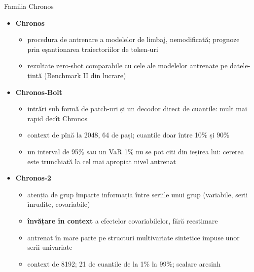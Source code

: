 \begin{frame}{Familia Chronos}
\itemsize{\small}
\begin{itemize}
    \item \textbf{Chronos} 
    \begin{itemize}
        \item procedura de antrenare a modelelor de limbaj, nemodificată; prognoze prin eșantionarea traiectoriilor de token-uri
        \item rezultate zero-shot comparabile cu cele ale modelelor antrenate pe datele-țintă (Benchmark II din lucrare)
    \end{itemize}
    \item \textbf{Chronos-Bolt}
    \begin{itemize}
        \item intrări sub formă de patch-uri și un decodor direct de cuantile: mult mai rapid decît Chronos
        \item context de pînă la 2048, 64 de pași; cuantile doar între 10\% și 90\%
        \item un interval de 95\% sau un VaR 1\% nu se pot citi din ieșirea lui: cererea este trunchiată la cel mai apropiat nivel antrenat
    \end{itemize}
    \item \textbf{Chronos-2} 
    \begin{itemize}
        \item atenția de grup împarte informația între seriile unui grup (variabile, serii înrudite, covariabile)
        \item \textbf{învățare în context} a efectelor covariabilelor, fără reestimare
        \item antrenat în mare parte pe structuri multivariate sintetice impuse unor serii univariate
        \item context de 8192; 21 de cuantile de la 1\% la 99\%; scalare arcsinh
    \end{itemize}
\end{itemize}
\end{frame}

